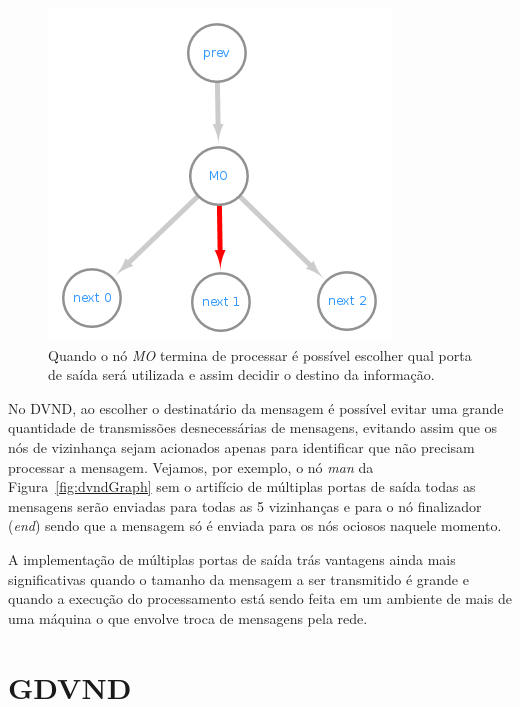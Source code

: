 \begin{figure}[htbp]
    \centerline{\includegraphics[scale=0.9]{figuras/dataflow/multi_output1.png}}
    \caption{Quando o nó \textit{MO} termina de processar é possível escolher qual porta de saída será utilizada e assim decidir o destino da informação.}
    \label{fig:dataflowMo1}
\end{figure}

No DVND, ao escolher o destinatário da mensagem é possível evitar uma grande quantidade de transmissões desnecessárias de mensagens, evitando assim que os nós de vizinhança sejam acionados apenas para identificar que não precisam processar a mensagem.
Vejamos, por exemplo, o nó \textit{man} da Figura~\ref{fig:dvndGraph} sem o artifício de múltiplas portas de saída todas as mensagens serão enviadas para todas as 5 vizinhanças e para o nó finalizador (\textit{end}) sendo que a mensagem só é enviada para os nós ociosos naquele momento.

A implementação de múltiplas portas de saída trás vantagens ainda mais significativas quando o tamanho da mensagem a ser transmitido é grande e quando a execução do processamento está sendo feita em um ambiente de mais de uma máquina o que envolve troca de mensagens pela rede.

\section{GDVND}\label{subsec:gdvnd}

